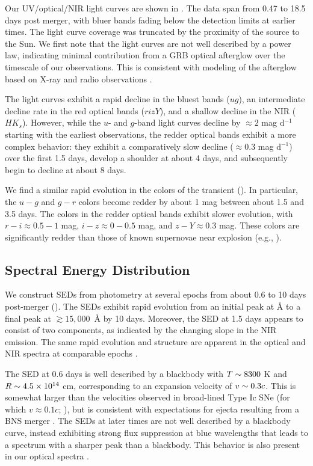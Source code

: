 Our UV/optical/NIR light curves are shown in . The data span from 0.47 to 18.5 days post merger, with bluer bands fading below the detection limits at earlier times.  The light curve coverage was truncated by the proximity of the source to the Sun.  We first note that the light curves are not well described by a power law, indicating minimal contribution from a GRB optical afterglow over the timescale of our observations. This is consistent with modeling of the afterglow based on X-ray and radio observations \citep{Alexander+17,Margutti+17}.

The light curves exhibit a rapid decline in the bluest bands ($ug$), an intermediate decline rate in the red optical bands ($rizY$), and a shallow decline in the NIR ($HK_s$).  However, while the $u$- and $g$-band light curves decline by $\approx 2$ mag d$^{-1}$ starting with the earliest observations, the redder optical bands exhibit a more complex behavior: they exhibit a comparatively slow decline ($\approx0.3$ mag d$^{-1}$) over the first 1.5 days, develop a shoulder at about 4 days, and subsequently begin to decline at about 8 days.

We find a similar rapid evolution in the colors of the transient ().  In particular, the $u-g$ and $g-r$ colors become redder by about 1 mag between about 1.5 and 3.5 days.  The colors in the redder optical bands exhibit slower evolution, with $r-i\approx 0.5-1$ mag, $i-z\approx 0-0.5$ mag, and $z-Y\approx 0.3$ mag.  These colors are significantly redder than those of known supernovae near explosion (e.g., \citealt{folatelli2009,bianco2014,galbany2016}).

\subsection{Spectral Energy Distribution}
\label{sec:ch5_SED}

We construct SEDs from photometry at several epochs from about 0.6 to 10 days post-merger (). The SEDs exhibit rapid evolution from an initial peak at  $\mbox{\AA}$ to a final peak at $\gtrsim 15,000$~$\mbox{\AA}$ by 10 days.  Moreover, the SED at 1.5 days appears to consist of two components, as indicated by the changing slope in the NIR emission. The same rapid evolution and structure are apparent in the optical and NIR spectra at comparable epochs \citep{Chornock+17,Nicholl+17a}.

The SED at 0.6 days is well described by a blackbody with $T\sim 8300$ K and $R\sim 4.5\times 10^{14}$ cm, corresponding to an expansion velocity of $v\sim 0.3c$. This is somewhat larger than the velocities observed in broad-lined Type Ic SNe (for which $v\approx 0.1c$; \citealt{Modjaz+16}), but is consistent with expectations for ejecta resulting from a BNS merger \citep{Metzger2017}. The SEDs at later times are not well described by a blackbody curve, instead exhibiting strong flux suppression at blue wavelengths that leads to a spectrum with a sharper peak than a blackbody.  This behavior is also present in our optical spectra \citep{Nicholl+17a}.

